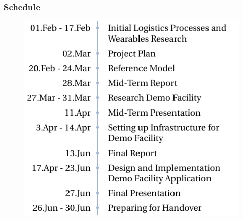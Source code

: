 \begin{frame}\frametitle{Schedule}
\begin{figure}
	\includegraphics[height=0.8\textheight]{images/TimeLine}
\end{figure}
\end{frame}
